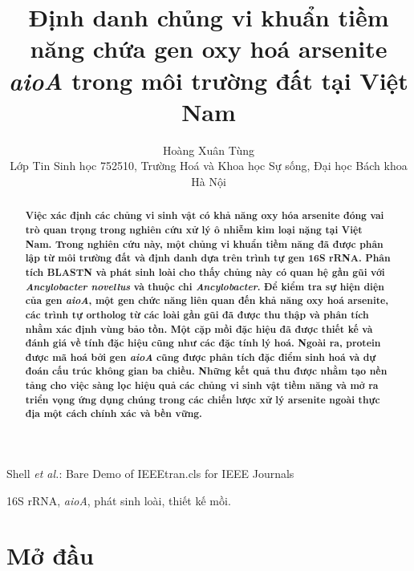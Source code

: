 \documentclass[journal]{IEEEtran}
\begin{document}
	
	\title{Định danh chủng vi khuẩn tiềm năng chứa gen oxy hoá arsenite \textit{aioA} trong môi trường đất tại Việt Nam}
	
	\author{Hoàng Xuân Tùng \\
		{\small Lớp Tin Sinh học 752510, Trường Hoá và Khoa học Sự sống, Đại học Bách khoa Hà Nội}
	}
	
	{Shell \MakeLowercase{\textit{et al.}}: Bare Demo of IEEEtran.cls for IEEE Journals}
	
	\maketitle
	
	\begin{abstract}
		\textbf{Việc xác định các chủng vi sinh vật có khả năng oxy hóa arsenite đóng vai trò quan trọng trong nghiên cứu xử lý ô nhiễm kim loại nặng tại Việt Nam. Trong nghiên cứu này, một chủng vi khuẩn tiềm năng đã được phân lập từ môi trường đất và định danh dựa trên trình tự gen 16S rRNA. Phân tích {\footnotesize BLASTN} và phát sinh loài cho thấy chủng này có quan hệ gần gũi với \textit{Ancylobacter novellus} và thuộc chi \textit{Ancylobacter}. Để kiểm tra sự hiện diện của gen \textit{aioA}, một gen chức năng liên quan đến khả năng oxy hoá arsenite, các trình tự ortholog từ các loài gần gũi đã được thu thập và phân tích nhằm xác định vùng bảo tồn. Một cặp mồi đặc hiệu đã được thiết kế và đánh giá về tính đặc hiệu cũng như các đặc tính lý hoá. Ngoài ra, protein được mã hoá bởi gen \textit{aioA} cũng được phân tích đặc điểm sinh hoá và dự đoán cấu trúc không gian ba chiều. Những kết quả thu được nhằm tạo nền tảng cho việc sàng lọc hiệu quả các chủng vi sinh vật tiềm năng và mở ra triển vọng ứng dụng chúng trong các chiến lược xử lý arsenite ngoài thực địa một cách chính xác và bền vững.}
	\end{abstract}
	
	\begin{IEEEkeywords}
		16S rRNA, \textit{aioA}, phát sinh loài, thiết kế mồi.
	\end{IEEEkeywords}
	
	\section{Mở đầu}
	
\end{document}
